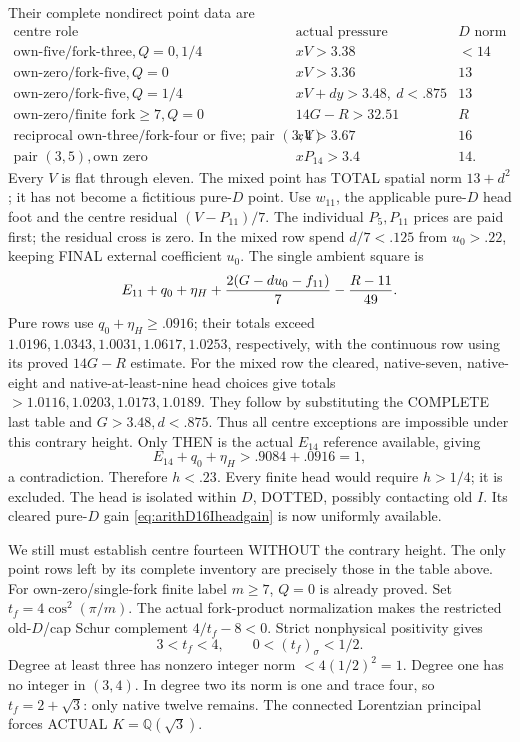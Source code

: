 Their complete nondirect point data are
\[
\begin{array}{c|c|c}
 \text{centre role}&\text{actual pressure}&D\text{ norm}\\ \hline
 \text{own-five/fork-three},Q=0,1/4&xV>3.38&<14\\
 \text{own-zero/fork-five},Q=0&xV>3.36&13\\
 \text{own-zero/fork-five},Q=1/4&xV+d y>3.48,\ d<.875&13\\
 \text{own-zero/finite fork}\ge7,Q=0&
                    14G-R>32.51&R\\
 \text{reciprocal own-three/fork-four or five; pair }(3,4)&xV>3.67&16\\
 \text{pair }(3,5),\text{own zero}&xP_{14}>3.4&14 .
\end{array}
\]
Every \(V\) is flat through eleven.
The mixed point has TOTAL spatial
norm \(13+d^2\); it has not become
a fictitious pure-\(D\) point.
Use \(w_{11}\), the applicable pure-\(D\)
head foot and the centre residual
\((V-P_{11})/7\).
The individual \(P_5,P_{11}\) prices
are paid first; the residual cross
is zero.
In the mixed row spend \(d/7<.125\)
from \(u_0>.22\), keeping FINAL external
coefficient \(u_0\).
The single ambient square is
\[
 E_{11}+q_0+\eta_H+
           {2(G-d u_0-f_{11})\over7}-{R-11\over49}.
\]
Pure rows use \(q_0+\eta_H\ge.0916\);
their totals exceed
\(1.0196,1.0343,1.0031,1.0617,1.0253\),
respectively, with the continuous row
using its proved \(14G-R\) estimate.
For the mixed row the cleared, native-seven,
native-eight and native-at-least-nine
head choices give totals \(>1.0116,
1.0203,1.0173,1.0189\).
They follow by substituting the COMPLETE
last table and \(G>3.48,d<.875\).
Thus all centre exceptions are impossible
under this contrary height.
Only THEN is the actual \(E_{14}\)
reference available, giving
\[
                         E_{14}+q_0+\eta_H>.9084+.0916=1 ,
\]
a contradiction.
Therefore \(h<.23\).
Every finite head would require \(h>1/4\);
it is excluded.
The head is isolated within \(D\),
DOTTED, possibly contacting old \(I\).
Its cleared pure-\(D\) gain
\eqref{eq:arithD16Iheadgain} is now
uniformly available.

We still must establish centre fourteen
WITHOUT the contrary height.
The only point rows left by its complete
inventory are precisely those in the
table above.
For own-zero/single-fork finite label
\(m\ge7\), \(Q=0\) is already proved.
Set \(t_f=4\cos^2(\pi/m)\).
The actual fork-product normalization
makes the restricted old-\(D\)/cap
Schur complement \(4/t_f-8<0\).
Strict nonphysical positivity gives
\[
                          3<t_f<4,\qquad0<(t_f)_\sigma<1/2 .
\]
Degree at least three has nonzero
integer norm \(<4(1/2)^2=1\).
Degree one has no integer in \((3,4)\).
In degree two its norm is one and
trace four, so
\(t_f=2+\sqrt3\): only native twelve
remains.
The connected Lorentzian principal
forces ACTUAL \(K=\mathbb Q(\sqrt3)\).

